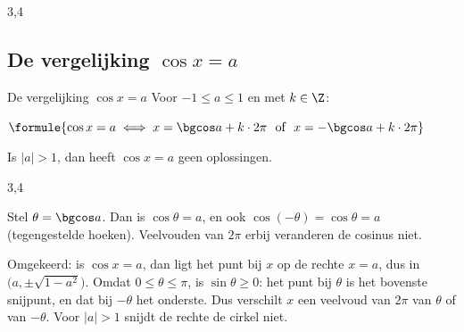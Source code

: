 \begin{oefeningen}
\end{oefeningen}

\begin{alleenvoor}{3,4}
\subsection{De vergelijking $\cos x = a$}


\begin{theorie}
\begin{stelling}{De vergelijking $\cos x = a$}
Voor $-1 \leqslant a \leqslant 1$ en met $k \in \Z$:

\vspace{1mm}
\qquad $\formule{\cos x = a \iff x = \bgcos a + k \cdot 2\pi \ \text{ of } \ x = -\bgcos a + k \cdot 2\pi}$

\vspace{1mm}
Is $|a| > 1$, dan heeft $\cos x = a$ geen oplossingen.
\end{stelling}
\begin{alleenvoor}{3,4}
\begin{bewijs}
Stel $\theta = \bgcos a$. Dan is $\cos\theta = a$, en ook $\cos(-\theta) = \cos\theta = a$ (tegengestelde hoeken). Veelvouden van $2\pi$ erbij veranderen de cosinus niet.

Omgekeerd: is $\cos x = a$, dan ligt het punt bij $x$ op de rechte $x = a$, dus in $\bigl(a, \pm\sqrt{1 - a^2}\bigr)$. Omdat $0 \leqslant \theta \leqslant \pi$, is $\sin\theta \geqslant 0$: het punt bij $\theta$ is het bovenste snijpunt, en dat bij $-\theta$ het onderste. Dus verschilt $x$ een veelvoud van $2\pi$ van $\theta$ of van $-\theta$. Voor $|a| > 1$ snijdt de rechte de cirkel niet.
\end{bewijs}
\end{alleenvoor}
\end{theorie}


\end{alleenvoor}
